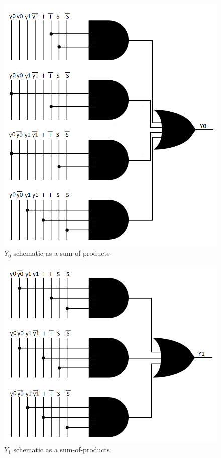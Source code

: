 \documentclass[../../e3_tp3_main.tex]{subfiles}
\begin{document}
\begin{figure}[H]
	\centering
	\includegraphics{figures/mealy_Y0_schem.PNG}
	\caption{$Y_0$ schematic as a sum-of-products}
	\label{fig:ej1_mealy_Y0_schem}
\end{figure}
\begin{figure}[H]
	\centering
	\includegraphics{figures/mealy_Y1_schem.PNG}
	\caption{$Y_1$ schematic as a sum-of-products}
	\label{fig:ej1_mealy_Y1_schem}
\end{figure}
\end{document}
